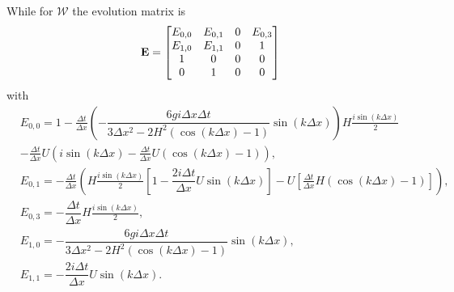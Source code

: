 While for $\mathcal{W}$ the evolution matrix is 
\begin{equation}
\label{eqn:AppEvolW}
\mathbf{E} = \begin{bmatrix}
{E}_{0,0} & {E}_{0,1} & 0 & E_{0,3} \\
{E}_{1,0} & E_{1,1} &0 & 1 \\
1&0&0&0\\
0&1&0&0
\end{bmatrix}
\end{equation}
with
\begin{align*}
&{E}_{0,0} = 1 - \frac{\Delta t}{\Delta x}\left(-\dfrac{6 gi \Delta x\Delta t}{3 \Delta x^2 -2{H^2} \left( \cos\left(k \Delta x\right) - 1 \right)}{ \sin\left(k \Delta x\right)}\right)H\frac{i\sin\left(k\Delta x\right)}{2} \\ &- \frac{\Delta t}{\Delta x}U\left(i\sin\left(k\Delta x\right) - \frac{\Delta t}{\Delta x}U\left(\cos\left(k\Delta x\right) - 1\right)\right), \\
&{E}_{0,1} = - \frac{\Delta t}{\Delta x} \left(H\frac{i\sin\left(k\Delta x\right)}{2}\left[ 1 -\dfrac{2i \Delta t }{\Delta x} U \sin\left(k \Delta x\right) \right]   -U\left[\frac{\Delta t}{\Delta x}H\left(\cos\left(k\Delta x\right) - 1\right)\right] \right),\\
& E_{0,3} = - \dfrac{\Delta t}{\Delta x}H\frac{i\sin\left(k\Delta x\right)}{2},  \\
& {E}_{1,0} =-\dfrac{6 gi \Delta x\Delta t}{3 \Delta x^2 -2{H^2} \left( \cos\left(k \Delta x\right) - 1 \right)}{ \sin\left(k \Delta x\right)}, \\
& {E}_{1,1} =-\dfrac{2i \Delta t }{\Delta x} U \sin\left(k \Delta x\right).
\end{align*}
